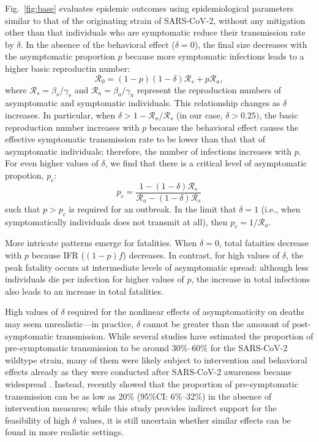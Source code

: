 \documentclass[12pt]{article}
\newcommand{\fref}[1]{Fig.~\ref{fig:#1}}
\newcommand{\RR}{\ensuremath{{\mathcal R}}\xspace}
\begin{document}
\fref{base} evaluates epidemic outcomes using epidemiological parameters similar to that of the originating strain of SARS-CoV-2, without any mitigation other than that individuals who are symptomatic reduce their transmission rate by $\delta$. 
In the absence of the behavioral effect ($\delta=0$), the final size decreases with the asymptomatic proportion $p$ because more symptomatic infections leads to a higher basic reproductin number:
\begin{equation}
\RR_0 = (1-p) (1-\delta) \RR_s + p \RR_a,
\end{equation}
where $\RR_s = \beta_s/\gamma_s$ and $\RR_a = \beta_a/\gamma_a$ represent the reproduction numbers of asymptomatic and symptomatic individuals.
This relationship changes as $\delta$ increases.
In particular, when $\delta > 1-\RR_a/\RR_s$ (in our case, $\delta > 0.25)$, the basic reproduction number increases with $p$ because the behavioral effect causes the effective symptomatic transmission rate to be lower than that that of asymptomatic individuals;
therefore, the number of infections increases with $p$.
For even higher values of $\delta$, we find that there is a critical level of asymptomatic propotion, $p_c$:
\begin{equation}
    p_c = \frac{1 - (1-\delta) \RR_s}{\RR_a - (1-\delta) \RR_s}
\end{equation}
such that $p>p_c$ is required for an outbreak. 
In the limit that $\delta=1$ (i.e., when symptomatically individuals does not transmit at all), then $p_c=1/\RR_a$.

More intricate patterns emerge for fatalities.
When $\delta = 0$, total fataities decrease with $p$ because IFR ($(1-p)f$) decreases.
In contrast, for high values of $\delta$, the peak fatality occurs at intermediate levels of asymptomatic spread:
although less individuals die per infection for higher values of $p$, the increase in total infections also leads to an increase in total fatalities.

High values of $\delta$ required for the nonlinear effects of asymptomaticity on deaths may seem unrealistic---in practice, $\delta$ cannot be greater than the amouont of post-symptomatic transmission.
While several studies have estimated the proportion of pre-symptomatic transmission to be around 30\%--60\% for the SARS-CoV-2 wildtype strain, many of them were likely subject to intervention and behavioral effects already as they were conducted after SARS-CoV-2 awareness became widespread \citep{he2020temporal}.
Instead, \cite{sender2021unmitigated} recently showed that the proportion of pre-symptomatic transmission can be as low as 20\% (95\%CI: 6\%--32\%) in the absence of intervention measures;
while this study provides indirect support for the feasibility of high $\delta$ values, it is still uncertain whether similar effects can be found in more realistic settings.
\end{document}
